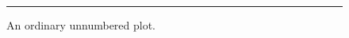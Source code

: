 \documentclass[aspectratio=169]{beamer}
\begin{document}
\begin{frame}[plain,t]
\begin{figure}
\centering
\rule{70pt}{25pt}
\caption*{An ordinary unnumbered plot.}
\end{figure}
\end{frame}
\end{document}
